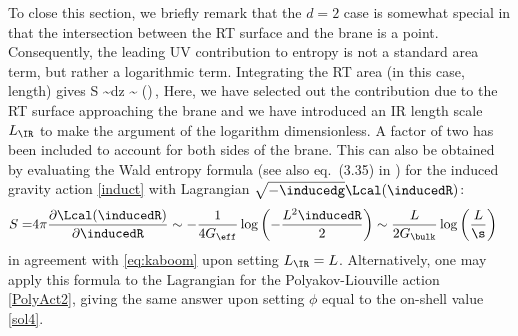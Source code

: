 
To close this section, we briefly remark that the $d=2$ case is somewhat special in that the intersection between the RT surface and the brane is a point. Consequently, the leading UV contribution to entropy is not a standard area term, but rather a logarithmic term. Integrating the RT area (in this case, length) gives
\beq
S
\sim {}\int {}dz
\sim {} \log\left(\right)\,,
\label{eq:kaboom}
\eeq
Here, we have selected out the contribution due to the RT surface approaching the brane and we have introduced an IR length scale $L_\IR$ to make the argument of the logarithm dimensionless. A factor of two has been included to account for both sides of the brane. This can also be obtained by evaluating the Wald entropy formula \cite{Wald:1993nt} (see also eq.~(3.35) in \cite{Dong:2013qoa}) for the induced gravity action \eqref{induct} with Lagrangian $\sqrt{-\inducedg}\Lcal(\inducedR)$:
\begin{align}
 S
 =& 4\pi \frac{\partial \Lcal(\inducedR)}{\partial \inducedR}
 \sim -\frac{1}{4G_\eff} \log\left(-\frac{L^2 \inducedR}{2}\right)
 \sim \frac{L}{2G_\bulk} \log\left(\frac{L}{\s}\right)
\end{align}
in agreement with \eqref{eq:kaboom} upon setting $L_\IR=L$. Alternatively, one may apply this formula to the Lagrangian for the Polyakov-Liouville action \eqref{PolyAct2}, giving the same answer upon setting $\phi$ equal to the on-shell value \eqref{sol4}.
